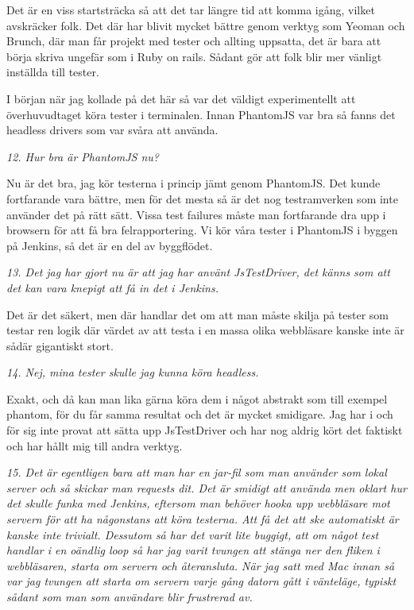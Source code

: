 \documentclass[11pt]{article}
\begin{document}
Det är en viss startsträcka så att det tar längre tid att komma igång, vilket avskräcker folk. Det där har blivit mycket bättre genom verktyg som Yeoman och Brunch, där man får projekt med tester och allting uppsatta, det är bara att börja skriva ungefär som i Ruby on rails. Sådant gör att folk blir mer vänligt inställda till tester.

I början när jag kollade på det här så var det väldigt experimentellt att överhuvudtaget köra tester i terminalen. Innan PhantomJS var bra så fanns det headless drivers som var svåra att använda.

\emph{12. Hur bra är PhantomJS nu?}

Nu är det bra, jag kör testerna i princip jämt genom PhantomJS. Det kunde fortfarande vara bättre, men för det mesta så är det nog testramverken som inte använder det på rätt sätt. Vissa test failures måste man fortfarande dra upp i browsern för att få bra felrapportering. Vi kör våra tester i PhantomJS i byggen på Jenkins, så det är en del av byggflödet.

\emph{13. Det jag har gjort nu är att jag har använt JsTestDriver, det känns som att det kan vara knepigt att få in det i Jenkins.}

Det är det säkert, men där handlar det om att man måste skilja på tester som testar ren logik där värdet av att testa i en massa olika webbläsare kanske inte är sådär gigantiskt stort.

\emph{14. Nej, mina tester skulle jag kunna köra headless.}

Exakt, och då kan man lika gärna köra dem i något abstrakt som till exempel phantom, för du får samma resultat och det är mycket smidigare. Jag har i och för sig inte provat att sätta upp JsTestDriver och har nog aldrig kört det faktiskt och har hållt mig till andra verktyg.

\emph{15. Det är egentligen bara att man har en jar-fil som man använder som lokal server och så skickar man requests dit. Det är smidigt att använda men oklart hur det skulle funka med Jenkins, eftersom man behöver hooka upp webbläsare mot servern för att ha någonstans att köra testerna. Att få det att ske automatiskt är kanske inte trivialt. Dessutom så har det varit lite buggigt, att om något test handlar i en oändlig loop så har jag varit tvungen att stänga ner den fliken i webbläsaren, starta om servern och återansluta. När jag satt med Mac innan så var jag tvungen att starta om servern varje gång datorn gått i vänteläge, typiskt sådant som man som användare blir frustrerad av.}
\end{document}
